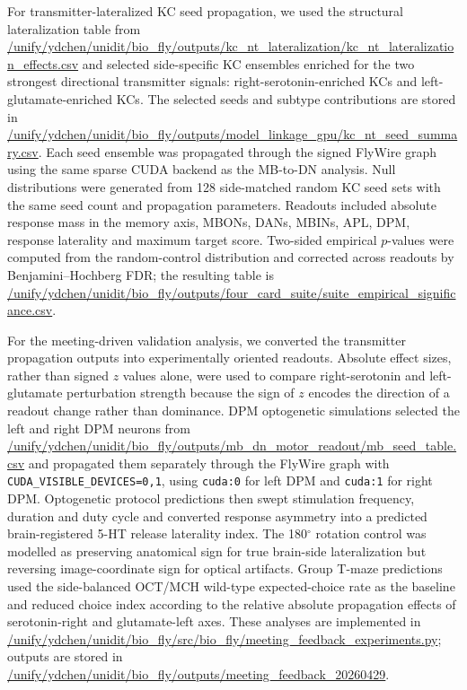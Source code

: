 \documentclass[10pt]{article}
\begin{document}
For transmitter-lateralized KC seed propagation, we used the structural lateralization table from \url{/unify/ydchen/unidit/bio_fly/outputs/kc_nt_lateralization/kc_nt_lateralization_effects.csv} and selected side-specific KC ensembles enriched for the two strongest directional transmitter signals: right-serotonin-enriched KCs and left-glutamate-enriched KCs. The selected seeds and subtype contributions are stored in \url{/unify/ydchen/unidit/bio_fly/outputs/model_linkage_gpu/kc_nt_seed_summary.csv}. Each seed ensemble was propagated through the signed FlyWire graph using the same sparse CUDA backend as the MB-to-DN analysis. Null distributions were generated from 128 side-matched random KC seed sets with the same seed count and propagation parameters. Readouts included absolute response mass in the memory axis, MBONs, DANs, MBINs, APL, DPM, response laterality and maximum target score. Two-sided empirical $p$-values were computed from the random-control distribution and corrected across readouts by Benjamini--Hochberg FDR; the resulting table is \url{/unify/ydchen/unidit/bio_fly/outputs/four_card_suite/suite_empirical_significance.csv}.

For the meeting-driven validation analysis, we converted the transmitter propagation outputs into experimentally oriented readouts. Absolute effect sizes, rather than signed $z$ values alone, were used to compare right-serotonin and left-glutamate perturbation strength because the sign of $z$ encodes the direction of a readout change rather than dominance. DPM optogenetic simulations selected the left and right DPM neurons from \url{/unify/ydchen/unidit/bio_fly/outputs/mb_dn_motor_readout/mb_seed_table.csv} and propagated them separately through the FlyWire graph with \texttt{CUDA\_VISIBLE\_DEVICES=0,1}, using \texttt{cuda:0} for left DPM and \texttt{cuda:1} for right DPM. Optogenetic protocol predictions then swept stimulation frequency, duration and duty cycle and converted response asymmetry into a predicted brain-registered 5-HT release laterality index. The 180$^\circ$ rotation control was modelled as preserving anatomical sign for true brain-side lateralization but reversing image-coordinate sign for optical artifacts. Group T-maze predictions used the side-balanced OCT/MCH wild-type expected-choice rate as the baseline and reduced choice index according to the relative absolute propagation effects of serotonin-right and glutamate-left axes. These analyses are implemented in \url{/unify/ydchen/unidit/bio_fly/src/bio_fly/meeting_feedback_experiments.py}; outputs are stored in \url{/unify/ydchen/unidit/bio_fly/outputs/meeting_feedback_20260429}.
\end{document}

